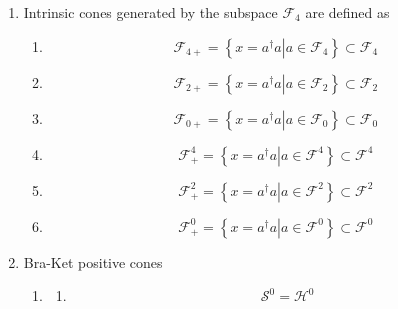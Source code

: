 \documentclass[aps,preprint]{revtex4}
\begin{document}
\begin{enumerate}
\item Intrinsic cones generated by the subspace $\mathcal{F}_{4}$ are
defined as

\begin{enumerate}
\item 
\begin{equation}
\mathcal{F}_{4+}=\left\{ \left. x=a^{\dagger }a\right\vert a\in \mathcal{F}%
_{4}\right\} \subset \mathcal{F}_{4}
\end{equation}

\item 
\begin{equation}
\mathcal{F}_{2+}=\left\{ \left. x=a^{\dagger }a\right\vert a\in \mathcal{F}%
_{2}\right\} \subset \mathcal{F}_{2}
\end{equation}

\item 
\begin{equation}
\mathcal{F}_{0+}=\left\{ \left. x=a^{\dagger }a\right\vert a\in \mathcal{F}%
_{0}\right\} \subset \mathcal{F}_{0}
\end{equation}

\item 
\begin{equation}
\mathcal{F}_{+}^{4}=\left\{ \left. x=a^{\dagger }a\right\vert a\in \mathcal{F%
}^{4}\right\} \subset \mathcal{F}^{4}
\end{equation}

\item 
\begin{equation}
\mathcal{F}_{+}^{2}=\left\{ \left. x=a^{\dagger }a\right\vert a\in \mathcal{F%
}^{2}\right\} \subset \mathcal{F}^{2}
\end{equation}

\item 
\begin{equation}
\mathcal{F}_{+}^{0}=\left\{ \left. x=a^{\dagger }a\right\vert a\in \mathcal{F%
}^{0}\right\} \subset \mathcal{F}^{0}
\end{equation}
\end{enumerate}

\item Bra-Ket positive cones

\begin{enumerate}
\item 
\begin{enumerate}
\item 
\begin{equation}
\mathcal{S}^{0}=\mathcal{H}^{0}
\end{equation}


\end{enumerate}
\end{enumerate}
\end{enumerate}
\end{document}
